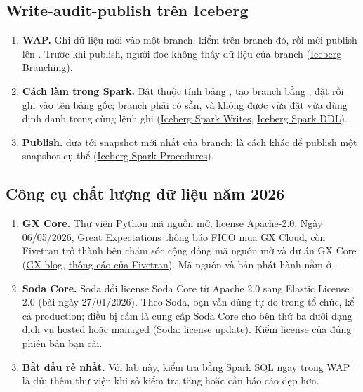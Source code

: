\subsection{Write-audit-publish trên Iceberg}
\begin{enumerate}[resume]
  \item \textbf{WAP.} Ghi dữ liệu mới vào một branch, kiểm trên branch đó, rồi mới publish lên . Trước khi publish, người đọc  không thấy dữ liệu của branch (\href{https://iceberg.apache.org/docs/latest/branching/}{Iceberg Branching}).
  \item \textbf{Cách làm trong Spark.} Bật thuộc tính bảng , tạo branch bằng , đặt  rồi ghi vào tên bảng gốc; branch phải có sẵn, và không được vừa đặt  vừa dùng định danh  trong cùng lệnh ghi (\href{https://iceberg.apache.org/docs/latest/spark-writes/}{Iceberg Spark Writes}, \href{https://iceberg.apache.org/docs/latest/spark-ddl/}{Iceberg Spark DDL}).
  \item \textbf{Publish.}  đưa  tới snapshot mới nhất của branch;  là cách khác để publish một snapshot cụ thể (\href{https://iceberg.apache.org/docs/latest/spark-procedures/}{Iceberg Spark Procedures}).
\end{enumerate}

\subsection{Công cụ chất lượng dữ liệu năm 2026}
\begin{enumerate}[resume]
  \item \textbf{GX Core.} Thư viện Python mã nguồn mở, license Apache-2.0. Ngày 06/05/2026, Great Expectations thông báo FICO mua GX Cloud, còn Fivetran trở thành bên chăm sóc cộng đồng mã nguồn mở và dự án GX Core (\href{https://www.greatexpectations.io/blog/an-update-from-great-expectations}{GX blog}, \href{https://www.fivetran.com/press/fivetran-to-become-steward-of-the-great-expectations-open-source-community-and-gx-core-project}{thông cáo của Fivetran}). Mã nguồn và bản phát hành nằm ở \href{https://github.com/fivetran/great_expectations/releases}{}.
  \item \textbf{Soda Core.} Soda đổi license Soda Core từ Apache 2.0 sang Elastic License 2.0 (bài ngày 27/01/2026). Theo Soda, bạn vẫn dùng tự do trong tổ chức, kể cả production; điều bị cấm là cung cấp Soda Core cho bên thứ ba dưới dạng dịch vụ hosted hoặc managed (\href{https://soda.io/blog/soda-core-license-update-moving-to-elastic-license}{Soda: license update}). Kiểm license của đúng phiên bản bạn cài.
  \item \textbf{Bắt đầu rẻ nhất.} Với lab này, kiểm tra bằng Spark SQL ngay trong WAP là đủ; thêm thư viện khi số kiểm tra tăng hoặc cần báo cáo đẹp hơn.
\end{enumerate}

